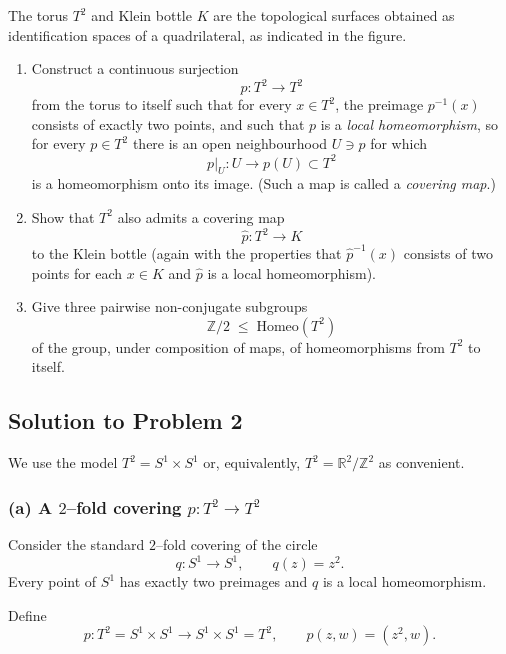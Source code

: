 \documentclass[12pt,a4paper]{article}
\theoremstyle{plain}
\theoremstyle{definition}      %
\begin{document}
The torus $T^{2}$ and Klein bottle $K$ are the topological surfaces obtained
as identification spaces of a quadrilateral, as indicated in the figure.

\begin{enumerate}[label=\textnormal{(\alph*)}]
	
	\item Construct a continuous surjection
	\[
	p : T^{2} \longrightarrow T^{2}
	\]
	from the torus to itself such that for every $x \in T^{2}$,
	the preimage $p^{-1}(x)$ consists of exactly two points, and such that
	$p$ is a \emph{local homeomorphism}, so for every $p \in T^{2}$ there is
	an open neighbourhood $U \ni p$ for which
	\[
	p|_{U} : U \to p(U) \subset T^{2}
	\]
	is a homeomorphism onto its image.
	(Such a map is called a \emph{covering map}.)
	
	\item Show that $T^{2}$ also admits a covering map
	\[
	\hat{p} : T^{2} \longrightarrow K
	\]
	to the Klein bottle (again with the properties that  
	$\hat{p}^{-1}(x)$ consists of two points for each $x \in K$ and  
	$\hat{p}$ is a local homeomorphism).
	
	\item Give three pairwise non-conjugate subgroups
	\[
	\mathbb{Z}/2 \;\le\; \mathrm{Homeo}(T^{2})
	\]
	of the group, under composition of maps, of homeomorphisms 
	from $T^{2}$ to itself.
	
\end{enumerate}


\subsection*{Solution to Problem 2}

We use the model $T^{2} = S^{1}\times S^{1}$ or, equivalently,
$T^{2} = \mathbb{R}^{2}/\mathbb{Z}^{2}$ as convenient.

\subsubsection*{(a) A $2$--fold covering $p:T^{2}\to T^{2}$}

Consider the standard $2$--fold covering of the circle
\[
q:S^{1}\to S^{1}, \qquad q(z)=z^{2}.
\]
Every point of $S^{1}$ has exactly two preimages and $q$ is a local
homeomorphism.

Define
\[
p : T^{2} = S^{1}\times S^{1} \longrightarrow S^{1}\times S^{1} = T^{2},
\qquad
p(z,w) = (z^{2}, w).
\]
\end{document}
